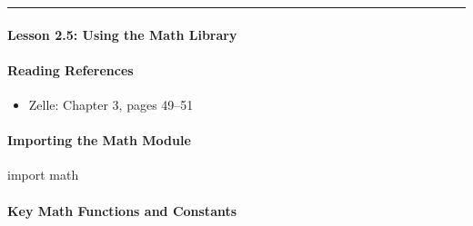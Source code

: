 \documentclass[
  justified,
  openright,
]{tufte-book}
\let\subsection\paragraph
\let\paragraph\paragraph
\newcommand{\CodeAccentTok}[1]{\textcolor{CodeAccent}{#1}}          %
\newenvironment{Shaded}{%
  \begin{mdframed}[style=TufteCode]%
}{%
  \end{mdframed}%
}
\let\subsection\paragraph
\let\paragraph\paragraph
\providecommand{\tightlist}{%
  \setlength{\itemsep}{0pt}\setlength{\parskip}{0pt}}
\begin{document}
\begin{center}\rule{0.5\linewidth}{0.5pt}\end{center}

\subsection{Lesson 2.5: Using the Math
Library}\label{lesson-2.5-using-the-math-library}

\subsection{Reading References}\label{reading-references-11}

\begin{itemize}
\tightlist
\item
  Zelle: Chapter 3, pages 49--51
\end{itemize}

\subsection{Importing the Math
Module}\label{importing-the-math-module}

\begin{Shaded}
\begin{Highlighting}[]
\CodeAccentTok{import} math
\end{Highlighting}
\end{Shaded}

\subsection{Key Math Functions and
Constants}\label{key-math-functions-and-constants}
\end{document}
